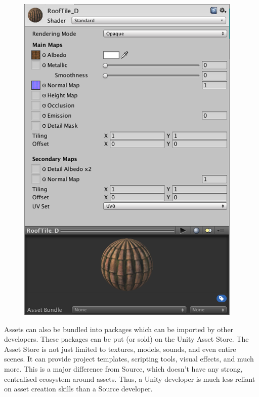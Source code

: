 \documentclass[a4paper, 12pt]{scrartcl}
\begin{document}
\begin{figure}
  \centering
  \includegraphics[width=\linewidth]{images/unity_material.png}
  \label{fig:unity_material}
\end{figure}

Assets can also be bundled into packages which can be imported by other developers. These packages can be put (or sold) on the Unity Asset Store. The Asset Store is not just limited to textures, models, sounds, and even entire scenes. It can provide project templates, scripting tools, visual effects, and much more. This is a major difference from Source, which doesn't have any strong, centralised ecosystem around assets. Thus, a Unity developer is much less reliant on asset creation skills than a Source developer.
\end{document}
